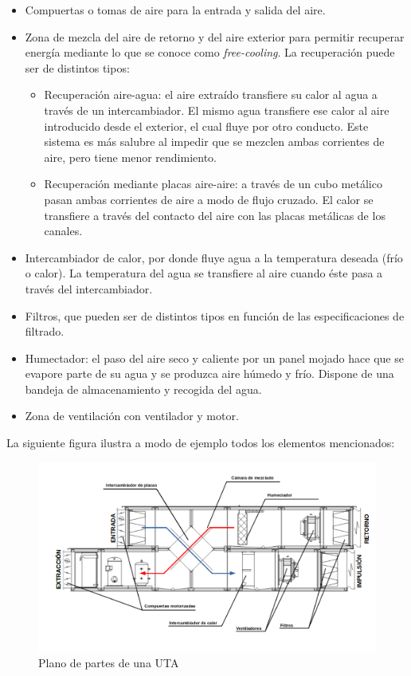 \begin{itemize}
    \item Compuertas o tomas de aire para la entrada y salida del aire.
    \item Zona de mezcla del aire de retorno y del aire exterior para permitir recuperar energía mediante lo que se conoce como \textit{free-cooling}. La recuperación puede ser de distintos tipos:
    \begin{itemize}
        \item Recuperación aire-agua: el aire extraído transfiere su calor al agua a través de un intercambiador. El mismo agua transfiere ese calor al aire introducido desde el exterior, el cual fluye por otro conducto. Este sistema es más salubre al impedir que se mezclen ambas corrientes de aire, pero tiene menor rendimiento.
        \item Recuperación mediante placas aire-aire: a través de un cubo metálico pasan ambas corrientes de aire a modo de flujo cruzado. El calor se transfiere a través del contacto del aire con las placas metálicas de los canales.
    \end{itemize}
    \item Intercambiador de calor, por donde fluye agua a la temperatura deseada (frío o calor). La temperatura del agua se transfiere al aire cuando éste pasa a través del intercambiador.
    \item Filtros, que pueden ser de distintos tipos en función de las especificaciones de filtrado.
    \item Humectador: el paso del aire seco y caliente por un panel mojado hace que se evapore parte de su agua y se produzca aire húmedo y frío. Dispone de una bandeja de almacenamiento y recogida del agua.
    \item Zona de ventilación con ventilador y motor.
\end{itemize}

La siguiente figura ilustra a modo de ejemplo todos los elementos mencionados:

\begin{figure}[H]
    \centering
    \includegraphics[width=\textwidth, keepaspectratio]{img/esquemaUTA}
    \caption{Plano de partes de una UTA}
    \label{figura:sasssssd}
\end{figure}
